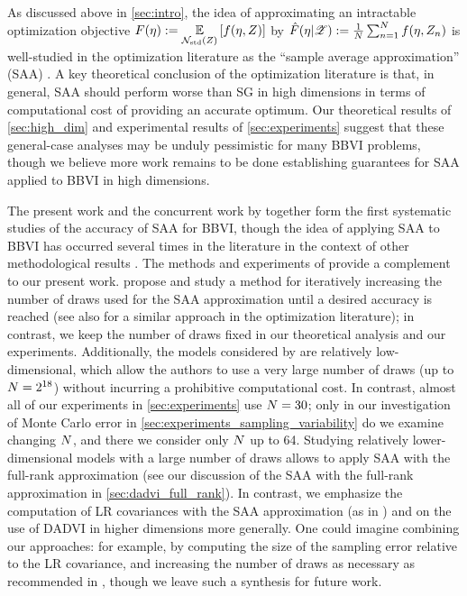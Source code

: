 As discussed above in \cref{sec:intro}, the idea of approximating an intractable
optimization objective $F(\eta) := \underset{\mathcal{N}_{\mathrm{std}}\left(Z\right)}{\mathbb{E}}\left[f(\eta, Z)\right]$ by
$\hat{F}(\eta | \mathscr{Z}) := \frac{1}{N}\sum_{n=1}^{N} f(\eta, Z_n)$ is well-studied in the optimization
literature as the ``sample average approximation'' (SAA) \citep[][Chapter
5]{nemirovski:2009:sgdvsfixed,royset:2013:optimalsaa,
kim:2015:guidetosaa,shapiro:2021:lectures}. A key theoretical conclusion of the
optimization literature is that, in general, SAA should perform worse than SG in
high dimensions in terms of computational cost of providing an accurate optimum.
Our theoretical results of \cref{sec:high_dim} and experimental results of
\cref{sec:experiments} suggest that these general-case analyses may be unduly
pessimistic for many BBVI problems, though we believe more work remains to be
done establishing guarantees for SAA applied to BBVI in high dimensions.

The present work and the concurrent work by \citet{burroni:2023:saabbvi}
together form the first systematic studies of the accuracy of SAA for BBVI,
though the idea of applying SAA to BBVI has occurred several times in the
literature in the context of other methodological results
\citep{giordano:2018:covariances,domke:2018:importanceweightingvi,domke:2019:divideandcouplevi,
broderick:2020:automatic,wycoff:2022:sparsebayesianlasso,giordano:2023:bnp}. The
methods and experiments of \citet{burroni:2023:saabbvi} provide a complement to
our present work. \citet{burroni:2023:saabbvi} propose and study a method for
iteratively increasing the number of draws used for the SAA approximation until
a desired accuracy is reached (see also \citet{royset:2013:optimalsaa} for a
similar approach in the optimization literature); in contrast, we keep the
number of draws fixed in our theoretical analysis and our experiments.
Additionally, the models considered by \citet{burroni:2023:saabbvi} are
relatively low-dimensional, which allow the authors to use a very large number
of draws (up to $N = 2^{18}$) without incurring a prohibitive computational
cost.  In contrast, almost all of our experiments in \cref{sec:experiments} use
$N = 30$; only in our investigation of Monte Carlo error in
\cref{sec:experiments_sampling_variability} do we examine changing $N$, and
there we consider only $N$ up to 64.  Studying relatively lower-dimensional
models with a large number of draws allows \citet{burroni:2023:saabbvi} to apply
SAA with the full-rank approximation (see our discussion of the SAA with the
full-rank approximation in \cref{sec:dadvi_full_rank}).  In contrast, we
emphasize the computation of LR covariances with the SAA approximation (as in
\citet{giordano:2018:covariances}) and on the use of DADVI in higher dimensions
more generally.  One could imagine combining our approaches: for example, by
computing the size of the sampling error relative to the LR covariance, and
increasing the number of draws as necessary as recommended in
\citet{burroni:2023:saabbvi}, though we leave such a synthesis for future work.
